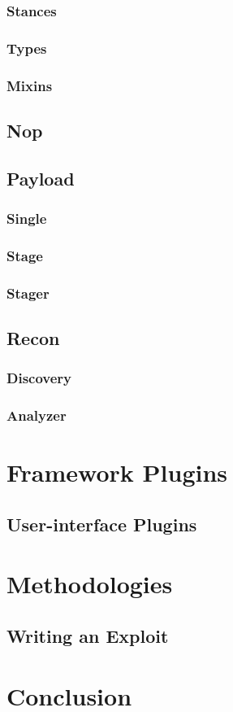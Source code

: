 \documentclass{report}
\begin{document}
        \subsection{Stances}
        \subsection{Types}
        \subsection{Mixins}
    \section{Nop}
    \section{Payload}
        \subsection{Single}
        \subsection{Stage}
        \subsection{Stager}
    \section{Recon}
        \subsection{Discovery}
        \subsection{Analyzer}
\chapter{Framework Plugins}
    \section{User-interface Plugins}
\chapter{Methodologies}
    \section{Writing an Exploit}
\chapter{Conclusion}
\end{document}
